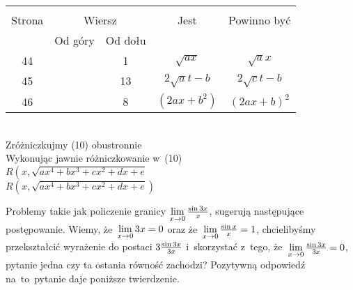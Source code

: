\documentclass[a4paper,11pt]{article}
\begin{document}
\begin{center}
  \begin{tabular}{|c|c|c|c|c|}
    \hline
    & \multicolumn{2}{c|}{} & & \\
    Strona & \multicolumn{2}{c|}{Wiersz} & Jest
                              & Powinno być \\ \cline{2-3}
    & Od góry & Od dołu & & \\
    \hline
    44  & &  1 & $\sqrt{ ax }$ & $\sqrt{ a } x$ \\
    45  & & 13 & $2 \sqrt{ a } t - b$ & $2 \sqrt{ c } t - b$ \\
    46  & &  8 & $( 2 ax + b^{ 2 } )$ & $( 2 ax + b )^{ 2 }$ \\
    \hline
  \end{tabular}
\end{center}
\noi
{} \\
 Zróżniczkujmy (10) obustronnie\ld \\
 Wykonując jawnie różniczkowanie w~(10)\ld \\
 \Jest
$R\left( x, \sqrt{ ax^{ 4 } + bx^{ 3 } + cx^{ 2 } + dx + e }
\right.$ \\
\Pow $R\left( x, \sqrt{ ax^{ 4 } + bx^{ 3 } + cx^{ 2 } + dx + e }
\right)$ \\

\vspace{\spaceTwo}








\start {} Problemy takie jak policzenie granicy
$\lim\limits_{ x \to 0 } \frac{ \sin 3 x }{ x }$, sugerują następujące
postępowanie. Wiemy, że~$\lim\limits_{ x \to 0 } 3x = 0$ oraz
że~$\lim\limits_{ x \to 0 } \frac{ \sin x }{ x } = 1$, chcielibyśmy
przekształcić wyrażenie do postaci $3 \frac{ \sin 3x }{ 3x }$
i~skorzystać z~tego, że~$\lim\limits_{ x \to 0 } \frac{ \sin 3x }{ 3x } = 0$,
pytanie jedna czy ta ostania równość zachodzi? Pozytywną odpowiedź
na~to~pytanie daje poniższe twierdzenie.
\end{document}
